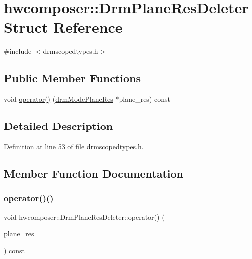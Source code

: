 \hypertarget{structhwcomposer_1_1DrmPlaneResDeleter}{}\section{hwcomposer\+:\+:Drm\+Plane\+Res\+Deleter Struct Reference}
\label{structhwcomposer_1_1DrmPlaneResDeleter}


{\ttfamily \#include $<$drmscopedtypes.\+h$>$}

\subsection*{Public Member Functions}
\begin{DoxyCompactItemize}
\item 
void \mbox{\hyperlink{structhwcomposer_1_1DrmPlaneResDeleter_a51c95387d3216d64570acb8d543d0f41}{operator()}} (\mbox{\hyperlink{drmscopedtypes_8h_abc090a2f00ebaea9426f9a5636f40994}{drm\+Mode\+Plane\+Res}} $\ast$plane\+\_\+res) const
\end{DoxyCompactItemize}


\subsection{Detailed Description}


Definition at line 53 of file drmscopedtypes.\+h.



\subsection{Member Function Documentation}
\mbox{\label{structhwcomposer_1_1DrmPlaneResDeleter_a51c95387d3216d64570acb8d543d0f41}} 
\subsubsection{\texorpdfstring{operator()()}{operator()()}}
{\footnotesize\ttfamily void hwcomposer\+::\+Drm\+Plane\+Res\+Deleter\+::operator() (\begin{DoxyParamCaption}\item[{\mbox{\hyperlink{drmscopedtypes_8h_abc090a2f00ebaea9426f9a5636f40994}{drm\+Mode\+Plane\+Res}} $\ast$}]{plane\+\_\+res }\end{DoxyParamCaption}) const}



